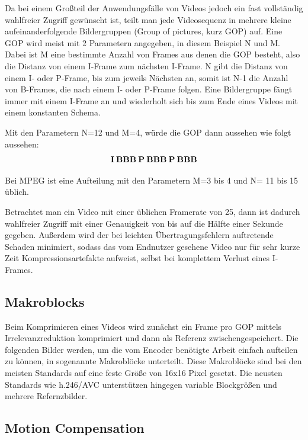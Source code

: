 Da bei einem Großteil der Anwendungsfälle von Videos jedoch ein fast vollständig wahlfreier Zugriff gewünscht ist, teilt man jede Videosequenz in mehrere kleine aufeinanderfolgende Bildergruppen (Group of pictures, kurz GOP) auf. Eine GOP wird meist mit 2 Parametern angegeben, in diesem Beispiel N und M.
Dabei ist M eine bestimmte Anzahl von Frames aus denen die GOP besteht, also die Distanz von einem I-Frame zum nächsten I-Frame.
N gibt die Distanz von einem I- oder P-Frame, bis zum jeweils Nächsten an, somit ist N-1 die Anzahl von B-Frames, die nach einem I- oder P-Frame folgen.\cite{huszak2010analysing}
Eine Bildergruppe fängt immer mit einem I-Frame an und wiederholt sich bis zum Ende eines Videos mit einem konstanten Schema.

Mit den Parametern N=12 und M=4, würde die GOP dann aussehen wie folgt aussehen:
\begin{align*}
\bold{I\:BBB\:P\:BBB\:P\:BBB}
\end{align*}


Bei MPEG ist eine Aufteilung mit den Parametern M=3 bis 4 und N= 11 bis 15 üblich. \cite{symes_peter_digital_2004}

Betrachtet man ein Video mit einer üblichen Framerate von 25, dann ist dadurch wahlfreier Zugriff mit einer Genauigkeit von bis auf die Hälfte einer Sekunde gegeben. Außerdem wird der bei leichten Übertragungsfehlern auftretende Schaden minimiert, sodass das vom Endnutzer gesehene Video nur für sehr kurze Zeit Kompressionsartefakte aufweist, selbst bei komplettem Verlust eines I-Frames. 

\subsection{Makroblocks}

Beim Komprimieren eines Videos wird zunächst ein Frame pro GOP mittels Irrelevanzreduktion komprimiert und dann als Referenz zwischengespeichert. Die folgenden Bilder werden, um die vom Encoder benötigte Arbeit einfach aufteilen zu können, in sogenannte Makroblöcke unterteilt. Diese Makroblöcke sind bei den meisten Standards auf eine feste Größe von 16x16 Pixel gesetzt.\cite{symes_peter_digital_2004} Die neusten Standards wie h.246/AVC unterstützen hingegen variable Blockgrößen und mehrere Refernzbilder. \cite{lin2009vlsi}

\subsection{Motion Compensation}

